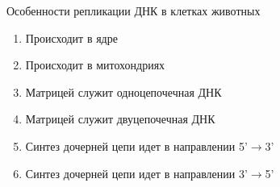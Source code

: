 
Особенности репликации ДНК в
клетках животных

\begin{enumerate}
    \item Происходит в ядре 
    \item Происходит в митохондриях 
    \item Матрицей служит одноцепочечная ДНК 
    \item Матрицей служит двуцепочечная ДНК 
    \item Синтез дочерней цепи идет в направлении 5’$\rightarrow$3’
    \item Синтез дочерней цепи идет в направлении 3’$\rightarrow$5’
\end{enumerate}




